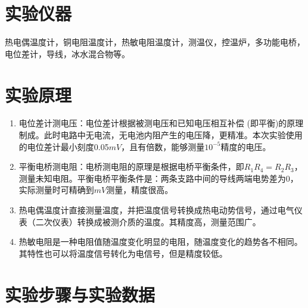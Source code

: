 \documentclass[11pt]{article}
\begin{document}
\section{实验仪器}
\hspace*{2em} 热电偶温度计，铜电阻温度计，热敏电阻温度计，测温仪，控温炉，多功能电桥，电位差计，导线，冰水混合物等。

\section{实验原理}
\begin{enumerate}
    \item 电位差计测电压：电位差计根据被测电压和已知电压相互补偿 (即平衡)的原理制成。此时电路中无电流，无电池内阻产生的电压降，更精准。本次实验使用的电位差计最小刻度0.05$mV$，且有倍数，能够测量$10^{-5}$精度的电压。
    \item 平衡电桥测电阻：电桥测电阻的原理是根据电桥平衡条件，即$R_{1}R_{4}=R_{2}R_{3}$，测量未知电阻。平衡电桥平衡条件是：两条支路中间的导线两端电势差为0，实际测量时可精确到$mV$测量，精度很高。
    \item 热电偶温度计直接测量温度，并把温度信号转换成热电动势信号，通过电气仪表（二次仪表）转换成被测介质的温度。其精度高，测量范围广。
    \item 热敏电阻是一种电阻值随温度变化明显的电阻，随温度变化的趋势各不相同。其特性也可以将温度信号转化为电信号，但是精度较低。
\end{enumerate}

\section{实验步骤与实验数据}
\end{document}

